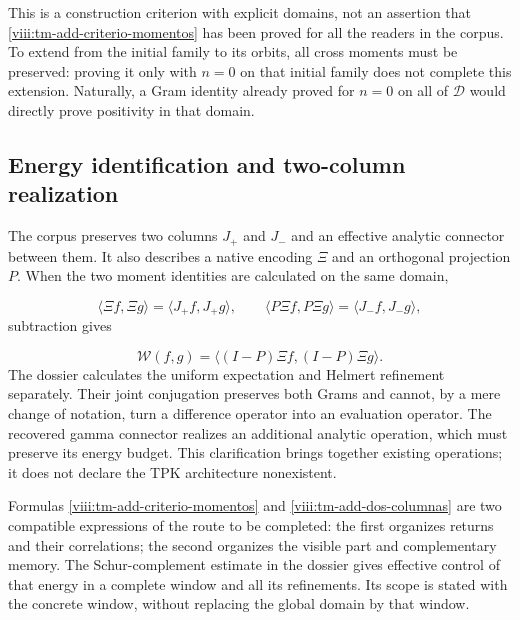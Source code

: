 This is a construction criterion with explicit domains, not an assertion that \eqref{viii:tm-add-criterio-momentos} has been proved for all the readers in the corpus. To extend from the initial family to its orbits, all cross moments must be preserved: proving it only with \(n=0\) on that initial family does not complete this extension. Naturally, a Gram identity already proved for \(n=0\) on all of \(\mathcal D\) would directly prove positivity in that domain.


\subsection{Energy identification and two-column realization}
\label{viii:tm-add-c6}
The corpus preserves two columns \(J_+\) and \(J_-\) and an effective analytic connector between them. It also describes a native encoding \(\Xi\) and an orthogonal projection \(P\). When the two moment identities are calculated on the same domain,

\[
\langle\Xi f,\Xi g\rangle=\langle J_+f,J_+g\rangle,
\qquad
\langle P\Xi f,P\Xi g\rangle=\langle J_-f,J_-g\rangle,
\]
subtraction gives

\begin{equation}
\mathscr W(f,g)=\langle(I-P)\Xi f,(I-P)\Xi g\rangle.
\label{viii:tm-add-dos-columnas}
\end{equation}
The dossier calculates the uniform expectation and Helmert refinement separately. Their joint conjugation preserves both Grams and cannot, by a mere change of notation, turn a difference operator into an evaluation operator. The recovered gamma connector realizes an additional analytic operation, which must preserve its energy budget. This clarification brings together existing operations; it does not declare the TPK architecture nonexistent.

Formulas \eqref{viii:tm-add-criterio-momentos} and \eqref{viii:tm-add-dos-columnas} are two compatible expressions of the route to be completed: the first organizes returns and their correlations; the second organizes the visible part and complementary memory. The Schur-complement estimate in the dossier gives effective control of that energy in a complete window and all its refinements. Its scope is stated with the concrete window, without replacing the global domain by that window.


